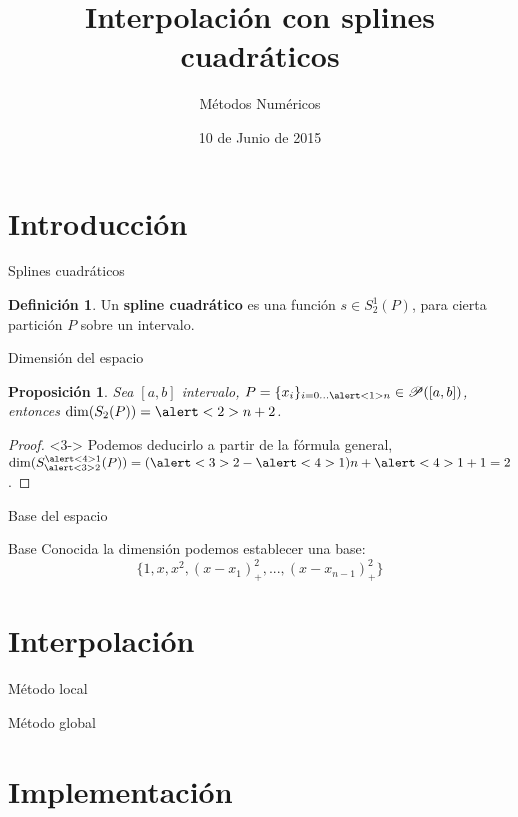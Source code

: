 \documentclass[compress]{beamer}
\title{Interpolación con splines cuadráticos} %
\subtitle{Métodos Numéricos}                  %
\author[Rubén M. \and Pablo B. \and Francisco M. \and Pablo M.\and Miguel A.]
{\texorpdfstring{
  \begin{columns}
    \column{.2\linewidth}
    \centering
    Rubén Morales \\
    \column{.2\linewidth}
    \centering
    Pablo Baeyens \\
    \column{.2\linewidth}
    \centering
    Francisco Morales \\
    \column{.2\linewidth}
    \centering
    Pablo Medina \\
    \column{.2\linewidth}
    \centering
    Miguel Anguita \\
  \end{columns}
}{
Rubén Morales \and Pablo Baeyens \and Francisco Morales
\and Pablo Medina \and Miguel Anguita
}}
\date{10 de Junio de 2015} %
\newtheorem*{proposicion}{Proposición}
\theoremstyle{definition}
\newtheorem*{definicion}{Definición}
\theoremstyle{remark}
\begin{document}
\begin{frame}
\titlepage
\end{frame}

\section{Introducción}

\begin{frame}{Splines cuadráticos}
\begin{definicion}
Un \textbf{spline cuadrático} es una función $s \in S_2^1(P)$, para
cierta partición $P$ sobre un intervalo.
\end{definicion}
\end{frame}

\begin{frame}{Dimensión del espacio}
\begin{proposicion}
Sea $[a,b]$ intervalo, $P = \{x_i\}_{i=0...\alert<1>{n}} \in \mathscr{P}([a,b])$,
entonces $\dim(S_2(P)) = \alert<2>{n+2}$.
\end{proposicion}
\begin{proof}<3->
Podemos deducirlo a partir de la fórmula general, $\dim(S_{\alert<3>{2}}^{\alert<4>{1}}(P)) = (\alert<3>{2} - \alert<4>{1})n +
\alert<4>{1} + 1 = 2$.
\end{proof}
\end{frame}

\begin{frame}{Base del espacio}
\begin{block}{Base}
Conocida la dimensión podemos establecer una base:
\[\{1, x, x^2, (x-x_1)_+^2, ... , (x-x_{n-1})_+^2\}\]
\end{block}
\end{frame}

\section{Interpolación}

\begin{frame}{Método local}
\end{frame}

\begin{frame}{Método global}
\end{frame}

\section{Implementación}
\end{document}
